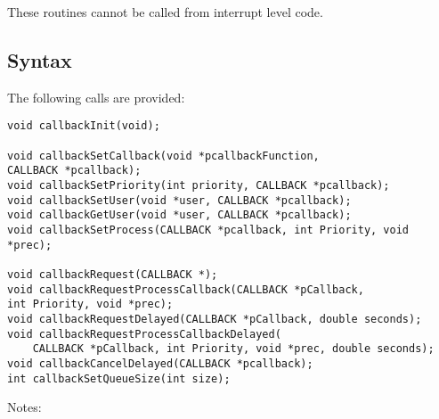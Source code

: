 \begin{description}\item These routines cannot be called from interrupt level code.

\end{description}\subsection{Syntax}

The following calls are provided:

\begin{verbatim}void callbackInit(void);

void callbackSetCallback(void *pcallbackFunction,
CALLBACK *pcallback);
void callbackSetPriority(int priority, CALLBACK *pcallback);
void callbackSetUser(void *user, CALLBACK *pcallback);
void callbackGetUser(void *user, CALLBACK *pcallback);
void callbackSetProcess(CALLBACK *pcallback, int Priority, void *prec);

void callbackRequest(CALLBACK *);
void callbackRequestProcessCallback(CALLBACK *pCallback,
int Priority, void *prec);
void callbackRequestDelayed(CALLBACK *pCallback, double seconds);
void callbackRequestProcessCallbackDelayed(
    CALLBACK *pCallback, int Priority, void *prec, double seconds);
void callbackCancelDelayed(CALLBACK *pcallback);
int callbackSetQueueSize(int size);

\end{verbatim}
Notes:

